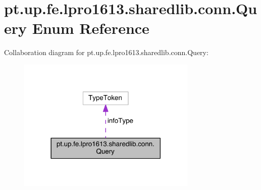 \hypertarget{enumpt_1_1up_1_1fe_1_1lpro1613_1_1sharedlib_1_1conn_1_1_query}{}\section{pt.\+up.\+fe.\+lpro1613.\+sharedlib.\+conn.\+Query Enum Reference}
\label{enumpt_1_1up_1_1fe_1_1lpro1613_1_1sharedlib_1_1conn_1_1_query}


Collaboration diagram for pt.\+up.\+fe.\+lpro1613.\+sharedlib.\+conn.\+Query\+:
\nopagebreak
\begin{figure}[H]
\begin{center}
\leavevmode
\includegraphics[width=242pt]{enumpt_1_1up_1_1fe_1_1lpro1613_1_1sharedlib_1_1conn_1_1_query__coll__graph}
\end{center}
\end{figure}
